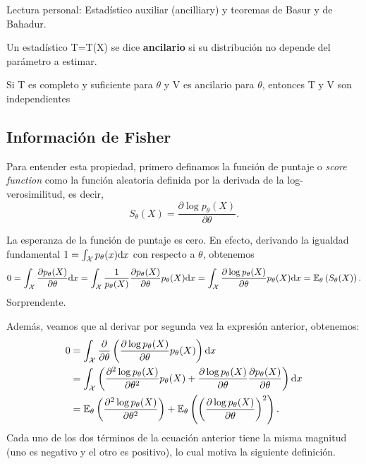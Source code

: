 \begin{remark}
Lectura personal: Estadístico auxiliar (ancilliary) y teoremas de Basur y de Bahadur. 
\end{remark}

\begin{definition}
Un estadístico T=T(X) se dice \textbf{ancilario} si su distribución no depende del parámetro a estimar.
\end{definition}

\begin{theorem}
Si T es completo y suficiente para $\theta$ y V es ancilario para $\theta$, entonces T y V son independientes
\end{theorem}


\subsection{Información de Fisher}

Para entender esta propiedad, primero definamos la función de puntaje o \textit{score function} como la {función aleatoria} definida por la derivada de la log-verosimilitud, es decir, 
\begin{equation}
	S_\theta(X) = \frac{\partial \log p_\theta(X)}{\partial\theta}.
\end{equation}

\begin{remark}
La esperanza de la función de puntaje es cero. En efecto, derivando la igualdad fundamental $1 = \int_{\mathcal X} p_\theta(x){\text{d}x}$ con respecto a $\theta$, obtenemos 
\begin{align}
	0 = \int_{\mathcal X} \frac{\partial  p_\theta(X)}{\partial\theta} {\text{d}x} = \int_{\mathcal X} \frac{1}{p_\theta(X)}\frac{\partial  p_\theta(X)}{\partial\theta} p_\theta(X) {\text{d}x} = \int_{\mathcal X} \frac{\partial \log   p_\theta(X)}{\partial\theta} p_\theta(X) {\text{d}x} = \mathbb{E}_\theta \left(S_\theta(X)\right).
\end{align}
Sorprendente. 
\end{remark}

Además, veamos que al derivar por segunda vez la expresión anterior, obtenemos: 
\begin{align*}
	0 &= \int_{\mathcal X} \frac{\partial}{\partial \theta }\left(\frac{\partial \log   p_\theta(X)}{\partial\theta} p_\theta(X) \right){\text{d}x}\\ 
	&= \int_{\mathcal X} \left(\frac{\partial^2 \log   p_\theta(X)}{\partial\theta^2} p_\theta(X) + \frac{\partial \log   p_\theta(X)}{\partial\theta}\frac{\partial   p_\theta(X)}{\partial\theta}  \right){\text{d}x}\\
	&= \mathbb{E}_\theta \left(\frac{\partial^2 \log   p_\theta(X)}{\partial\theta^2}\right) + \mathbb{E}_\theta \left(\left(\frac{\partial \log   p_\theta(X)}{\partial\theta}\right)^2\right).
\end{align*}
Cada uno de los dos términos de la ecuación anterior tiene la misma magnitud (uno es negativo y el otro es positivo), lo cual motiva la siguiente definición.

